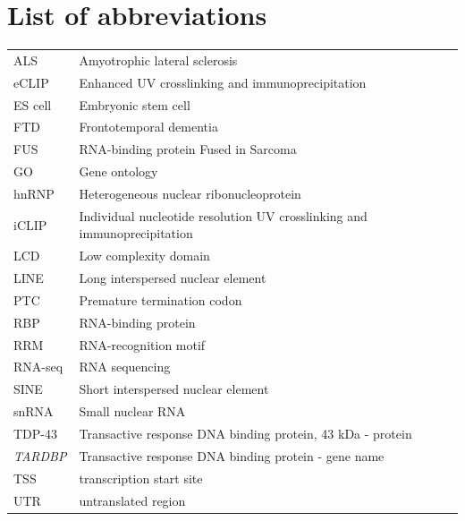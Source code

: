 \documentclass[a4paper,11pt,twoside]{report}
\begin{document}
\section*{\LARGE{List of abbreviations}}
\begin{table}[h!]
	\begin{tabular}{ll}
		ALS & Amyotrophic lateral sclerosis \\
		eCLIP & Enhanced UV crosslinking and immunoprecipitation \\
		ES cell & Embryonic stem cell \\
		FTD	& Frontotemporal dementia \\
		FUS & RNA-binding protein Fused in Sarcoma \\
		GO & Gene ontology \\
		hnRNP &	Heterogeneous nuclear ribonucleoprotein\\
		iCLIP & Individual nucleotide resolution UV crosslinking and immunoprecipitation \\
		LCD & Low complexity domain \\
		LINE & Long interspersed nuclear element \\
		PTC	& Premature termination codon \\
		RBP & RNA-binding protein \\
		RRM & RNA-recognition motif \\
		RNA-seq & RNA sequencing \\
		SINE & Short interspersed nuclear element \\
		snRNA & Small nuclear RNA \\
		TDP-43 & Transactive response DNA binding protein, 43 kDa - protein \\
		\textit{TARDBP} & Transactive response DNA binding protein - gene name \\
		TSS & transcription start site \\
		UTR & untranslated region \\
	\end{tabular}
\end{table}
\clearpage


%
%
%
%

%

\clearpage
%
\end{document}
